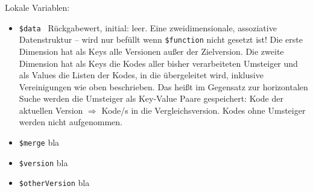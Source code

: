 Lokale Variablen:

\begin{itemize}
\item \texttt{\$data \hspace{3em}} Rückgabewert, initial: leer.
\newline Eine zweidimensionale, assoziative Datenstruktur -- wird nur befüllt wenn \texttt{\$function} nicht gesetzt ist! Die erste Dimension hat als Keys alle Versionen außer der Zielversion. Die zweite Dimension hat als Keys die Kodes aller bisher verarbeiteten Umsteiger und als Values die Listen der Kodes, in die übergeleitet wird, inklusive Vereinigungen wie oben beschrieben. Das heißt im Gegensatz zur horizontalen Suche werden die Umsteiger als Key-Value Paare gespeichert: Kode der aktuellen Version $\Rightarrow$ Kode/s in die Vergleichsversion. Kodes ohne Umsteiger werden nicht aufgenommen.
\item \texttt{\$merge}  \newline bla
\item \texttt{\$version} \newline bla
\item \texttt{\$otherVersion} \newline bla
\end{itemize}


